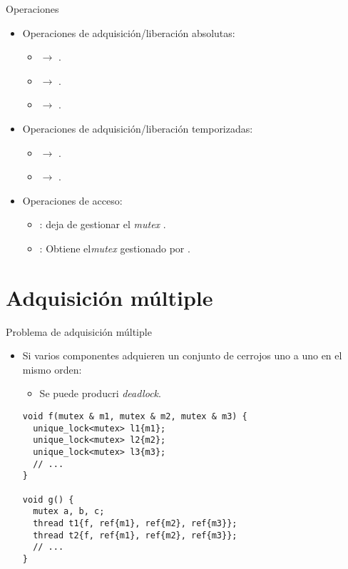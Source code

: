 \begin{frame}{Operaciones}
\begin{itemize}
  \item Operaciones de adquisición/liberación absolutas:
    \begin{itemize}
      \item {} $\rightarrow$ .
      \item {} $\rightarrow$ .
      \item {} $\rightarrow$ .
    \end{itemize}
  \item Operaciones de adquisición/liberación temporizadas:
    \begin{itemize}
      \item {} $\rightarrow$ .
      \item {} $\rightarrow$ .
    \end{itemize}
  \item Operaciones de acceso:
    \begin{itemize}
      \item {}:  deja de gestionar el \emph{mutex} .
      \item {}: Obtiene el\emph{mutex}  gestionado por .
    \end{itemize}
\end{itemize}
\end{frame}

\section{Adquisición múltiple}

\begin{frame}[fragile]{Problema de adquisición múltiple}
\begin{itemize}
  \item Si varios componentes adquieren un conjunto de cerrojos uno a uno en el mismo orden:
    \begin{itemize}
      \item Se puede producri \emph{deadlock}.
    \end{itemize}
\begin{lstlisting}
void f(mutex & m1, mutex & m2, mutex & m3) {
  unique_lock<mutex> l1{m1};
  unique_lock<mutex> l2{m2};
  unique_lock<mutex> l3{m3};
  // ...
}

void g() {
  mutex a, b, c;
  thread t1{f, ref{m1}, ref{m2}, ref{m3}};
  thread t2{f, ref{m1}, ref{m2}, ref{m3}};
  // ...
}
\end{lstlisting}
\end{itemize}
\end{frame}

